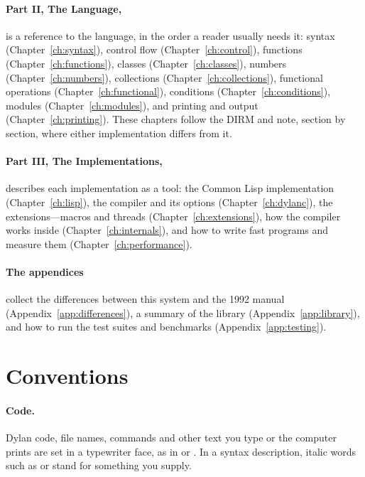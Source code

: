 \paragraph{Part II, The Language,} is a reference to the language, in the
order a reader usually needs it: syntax (Chapter~\ref{ch:syntax}), control
flow (Chapter~\ref{ch:control}), functions (Chapter~\ref{ch:functions}),
classes (Chapter~\ref{ch:classes}), numbers (Chapter~\ref{ch:numbers}),
collections (Chapter~\ref{ch:collections}), functional operations
(Chapter~\ref{ch:functional}), conditions (Chapter~\ref{ch:conditions}),
modules (Chapter~\ref{ch:modules}), and printing and output
(Chapter~\ref{ch:printing}). These chapters follow the DIRM and note,
section by section, where either implementation differs from it.

\paragraph{Part III, The Implementations,} describes each implementation
as a tool: the Common Lisp implementation (Chapter~\ref{ch:lisp}), the
 compiler and its options (Chapter~\ref{ch:dylanc}), the
extensions---macros and threads
(Chapter~\ref{ch:extensions}), how the compiler works inside
(Chapter~\ref{ch:internals}), and how to write fast programs and measure
them (Chapter~\ref{ch:performance}).

\paragraph{The appendices} collect the differences between this system and
the 1992 manual (Appendix~\ref{app:differences}), a summary of the library
(Appendix~\ref{app:library}), and how to run the test suites and
benchmarks (Appendix~\ref{app:testing}).

\section{Conventions}\label{sec:intro-conventions}

\paragraph{Code.} Dylan code, file names, commands and other text you type
or the computer prints are set in a typewriter face, as in
 or . In a syntax description,
italic words such as  or  stand for something you
supply.

